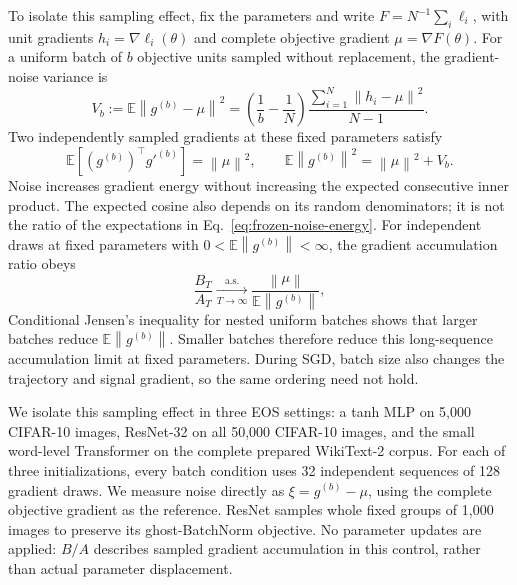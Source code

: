 \documentclass[11pt]{article}
\newcommand{\norm}[1]{\left\lVert#1\right\rVert}
\newcommand{\E}{\mathbb{E}}
\begin{document}
To isolate this sampling effect, fix the parameters and write
$F=N^{-1}\sum_i\ell_i$, with unit gradients $h_i=\nabla\ell_i(\theta)$
and complete objective gradient $\mu=\nabla F(\theta)$.
For a uniform batch of $b$ objective units sampled without replacement,
the gradient-noise variance is
\begin{equation}
  V_b:=\E\norm{g^{(b)}-\mu}^2
  =\left(\frac1b-\frac1N\right)
    \frac{\sum_{i=1}^N\norm{h_i-\mu}^2}{N-1}.
  \label{eq:finite-population-noise}
\end{equation}
Two independently sampled gradients at these fixed parameters satisfy
\begin{equation}
  \E[(g^{(b)})^\top g'^{(b)}]=\norm{\mu}^2,
  \qquad \E\norm{g^{(b)}}^2=\norm{\mu}^2+V_b.
  \label{eq:frozen-noise-energy}
\end{equation}
Noise increases gradient energy without increasing the expected consecutive
inner product. The expected cosine also depends on its random denominators;
it is not the ratio of the expectations in Eq.~\eqref{eq:frozen-noise-energy}.
For independent draws at fixed parameters with
$0<\E\norm{g^{(b)}}<\infty$, the gradient accumulation ratio obeys
\begin{equation}
  \frac{B_T}{A_T}\xrightarrow[T\to\infty]{\mathrm{a.s.}}
  \frac{\norm{\mu}}{\E\norm{g^{(b)}}},
  \label{eq:frozen-accumulation-limit}
\end{equation}
Conditional Jensen's inequality for
nested uniform batches shows that larger batches reduce
$\E\norm{g^{(b)}}$. Smaller batches therefore reduce this long-sequence
accumulation limit at fixed parameters. During SGD, batch size also changes
the trajectory and signal gradient, so the same ordering need not hold.

We isolate this sampling effect in three EOS settings: a tanh MLP on
5,000 CIFAR-10 images, ResNet-32 on all 50,000 CIFAR-10 images, and the
small word-level Transformer on the complete prepared WikiText-2 corpus.
For each of three initializations, every batch condition uses 32 independent
sequences of 128 gradient draws. We measure noise directly as
$\xi=g^{(b)}-\mu$, using the complete objective gradient as the reference.
ResNet samples whole fixed groups of 1,000 images to preserve its
ghost-BatchNorm objective. No parameter updates are applied: $B/A$
describes sampled gradient accumulation in this control, rather than actual
parameter displacement.
\end{document}
